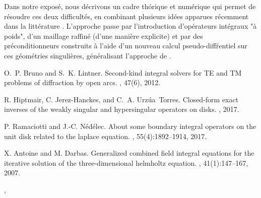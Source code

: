 \documentclass[10pt]{article}
\def\auteurenbasdepage#1#2#3{\small{\bf #1}, \small{#2}\\ \small{\tt #3}\\ }
\begin{document}
	Dans notre expos\'e, nous d\'ecrivons un cadre th\'orique et num\'erique qui permet de r\'esoudre ces deux difficult\'es, en combinant plusieurs id\'ees apparues r\'ecemment dans la litt\'erature \cite{bruno2012second,hiptmair2017closed,ramaciotti2017some}. L'approche passe par l'introduction d'op\'erateurs int\'egraux "\`a poids", d'un maillage raffin\'e (d'une mani\`ere explicite) et par des pr\'econditionneurs construits \`a l'aide d'un nouveau calcul pseudo-diff\'rentiel sur ces g\'eom\'etries singuli\`eres, g\'en\'eralisant l'approche de \cite{antoine2007generalized}. 
	
	
	
	\begin{thebibliography}{99}
		
		O.~P. Bruno and S.~K. Lintner.
		\newblock Second-kind integral solvers for TE and TM problems of diffraction by
		open arcs.
		, 47(6), 2012.
		
		R. Hiptmair, C. Jerez-Hanckes, and C.~A. Urz{\'u}a~Torres.
		\newblock Closed-form exact inverses of the weakly singular and hypersingular
		operators on disks.
		, 2017.
		
		P. Ramaciotti and J.-C. N{\'e}d{\'e}lec.
		\newblock About some boundary integral operators on the unit disk related to
		the laplace equation.
		, 55(4):1892--1914, 2017.
		
		X. Antoine and M. Darbas.
		\newblock Generalized combined field integral equations for the iterative
		solution of the three-dimensional helmholtz equation.
		,
		41(1):147--167, 2007.
		
	\end{thebibliography}
	\vfill
	\auteurenbasdepage{\NomOrateur}{\AdresseLongueOrateur}{\EmailOrateur}
\end{document}
